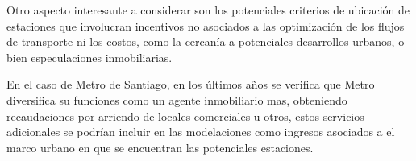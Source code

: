 \documentclass{article}
\begin{document}
Otro aspecto interesante a considerar son los potenciales criterios de ubicación de estaciones que involucran incentivos no asociados a las optimización de los flujos de transporte ni los costos, como la cercanía a potenciales desarrollos urbanos, o bien especulaciones inmobiliarias.

En el caso de Metro de Santiago, en los últimos años se verifica que Metro diversifica su funciones como un agente inmobiliario mas, obteniendo recaudaciones por arriendo de locales comerciales u otros, estos servicios adicionales se podrían incluir en las modelaciones como ingresos asociados a el marco urbano en que se encuentran las potenciales estaciones.




\nocite{*}
    
\end{document}
